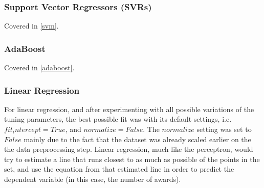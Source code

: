 \documentclass[journal,transmag]{IEEEtran}
\begin{document}
			\subsubsection{Support Vector Regressors (SVRs)}
			Covered in \ref{svm}.
			
			\subsubsection{AdaBoost}
			Covered in \ref{adaboost}.			
			
			\subsubsection{Linear Regression}
			For linear regression, and after experimenting with all possible variations of the tuning parameters, the best possible fit was with its default settings, i.e. $fit_intercept=True$, and $normalize=False$. The $normalize$ setting was set to $False$ mainly due to the fact that the dataset was already scaled earlier on the the data preprocessing step. Linear regression, much like the perceptron, would try to estimate a line that runs closest to as much as possible of the points in the set, and use the equation from that estimated line in order to predict the dependent variable (in this case, the number of awards).
	
\end{document}
